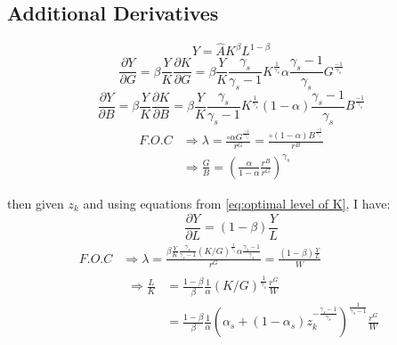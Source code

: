 \documentclass[12pt]{article} %
\begin{document}
\subsection*{Additional Derivatives}
\begin{equation*}
    Y = \hat{A} K^{\beta} L^{1-\beta}
\end{equation*}
\begin{equation*}
    \frac{\partial Y}{\partial G}   = \beta\frac{Y}{K} \frac{\partial K}{\partial G} = \beta\frac{Y}{K} \frac{\gamma_s}{\gamma_s-1} K ^{\frac{1}{\gamma_s}}\alpha \frac{\gamma_s-1}{\gamma_s}G^{\frac{-1}{\gamma_s}}
\end{equation*}
\begin{equation*}
    \frac{\partial Y}{\partial B} = \beta\frac{Y}{K} \frac{\partial K}{\partial B} = \beta\frac{Y}{K} \frac{\gamma_s}{\gamma_s-1} K ^{\frac{1}{\gamma_s}}(1-\alpha) \frac{\gamma_s-1}{\gamma_s}B^{\frac{-1}{\gamma_s}}
\end{equation*}
\begin{equation*}
    \begin{split}
        F.O.C &\Rightarrow \lambda = \frac{\circ \alpha G^{\frac{-1}{\gamma_s} }}{r^G} = \frac{\circ (1-\alpha) B^{\frac{-1}{\gamma_s} }}{r^B}\\
        & \Rightarrow \frac{G}{B} = \left(\frac{\alpha}{1-\alpha}\frac{r^B}{r^G}\right)^{\gamma_s}
    \end{split}
\end{equation*}

then given $z_k$ and using equations from \ref{eq:optimal level of K}, I have:
\begin{equation*}
    \frac{\partial Y}{\partial L} = (1-\beta)\frac{Y}{L} 
\end{equation*}
\begin{equation*}
    \begin{split}
        F.O.C &\Rightarrow \lambda = \frac{\beta\frac{Y}{K} \frac{\gamma_s}{\gamma_s-1} (K/G) ^{\frac{1}{\gamma_s}}\alpha \frac{\gamma_s-1}{\gamma_s}}{r^G} = \frac{(1-\beta)\frac{Y}{L}}{W}\\
        &  \begin{split}
            \Rightarrow\frac{L}{K} & = \frac{1-\beta}{\beta} \frac{1}{\alpha} (K/G) ^{\frac{1}{\gamma_s}} \frac{r^G}{W}\\
            & =  \frac{1-\beta}{\beta} \frac{1}{\alpha}(\alpha_s + (1-\alpha_s) z_k^{-\frac{\gamma_s-1}{\gamma_s}})^{\frac{1}{\gamma_s-1}} \frac{r^G}{W}
        \end{split}
    \end{split}
\end{equation*}

\subsection*{}


\end{document}
